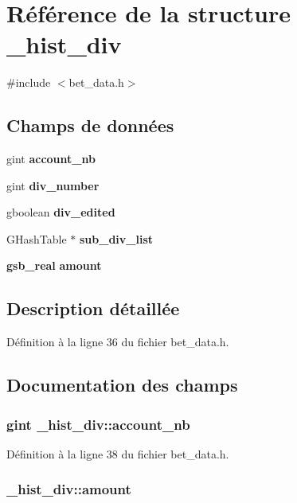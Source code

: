 \section{Référence de la structure \_\-hist\_\-div}
\label{struct__hist__div}


{\ttfamily \#include $<$bet\_\-data.h$>$}

\subsection*{Champs de données}
\begin{DoxyCompactItemize}
\item 
gint {\bf account\_\-nb}
\item 
gint {\bf div\_\-number}
\item 
gboolean {\bf div\_\-edited}
\item 
GHashTable $\ast$ {\bf sub\_\-div\_\-list}
\item 
{\bf gsb\_\-real} {\bf amount}
\end{DoxyCompactItemize}


\subsection{Description détaillée}


Définition à la ligne 36 du fichier bet\_\-data.h.



\subsection{Documentation des champs}
\subsubsection[{account\_\-nb}]{\setlength{\rightskip}{0pt plus 5cm}gint {\bf \_\-hist\_\-div::account\_\-nb}}\label{struct__hist__div_a0d788fd23a7bb0ae79e5f677889a0724}


Définition à la ligne 38 du fichier bet\_\-data.h.

\subsubsection[{amount}]{ {\bf \_\-hist\_\-div::amount}}\label{struct__hist__div_a472ec5b8c77191287a9131f2253829aa}


